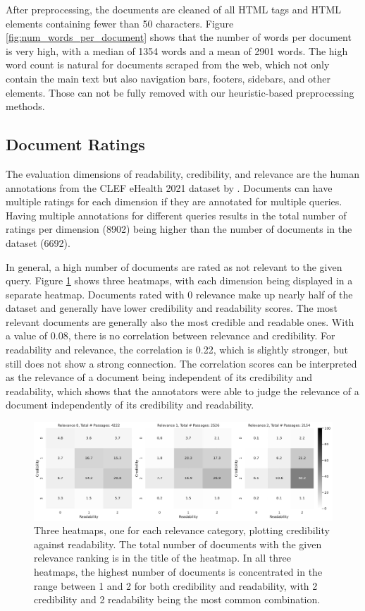 After preprocessing, the documents are cleaned of all HTML tags and HTML elements containing fewer than 50 characters.
Figure \ref{fig:num_words_per_document} shows that the number of words per document is very high, with a median of 1354 words and a mean of 2901 words.
The high word count is natural for documents scraped from the web, which not only contain the main text but also navigation bars, footers, sidebars, and other elements.
Those can not be fully removed with our heuristic-based preprocessing methods.
\subsection{Document Ratings}
The evaluation dimensions of readability, credibility, and relevance are the human annotations from the CLEF eHealth 2021 dataset by \cite{goeuriot:2021:Consumer}.
Documents can have multiple ratings for each dimension if they are annotated for multiple queries.
Having multiple annotations for different queries results in the total number of ratings per dimension (8902) being higher than the number of documents in the dataset (6692).


In general, a high number of documents are rated as not relevant to the given query.
Figure \ref{fig:heatmap_rel_cred_read} shows three heatmaps, with each dimension being displayed in a separate heatmap.
Documents rated with 0 relevance make up nearly half of the dataset and generally have lower credibility and readability scores.
The most relevant documents are generally also the most credible and readable ones.
With a value of 0.08, there is no correlation between relevance and credibility.
For readability and relevance, the correlation is 0.22, which is slightly stronger, but still does not show a strong connection.
The correlation scores can be interpreted as the relevance of a document being independent of its credibility and readability, which shows that the annotators were able to judge the relevance of a document independently of its credibility and readability.
\begin{figure}
\centering
\includegraphics[width=\textwidth]{images/heatmap_qrels.pdf}
\caption{Three heatmaps, one for each relevance category, plotting credibility against readability.
The total number of documents with the given relevance ranking is in the title of the heatmap.
In all three heatmaps, the highest number of documents is concentrated in the range between 1 and 2 for both credibility and readability, with 2 credibility and 2 readability being the most common combination.
}
\label{fig:heatmap_rel_cred_read}
\end{figure}

